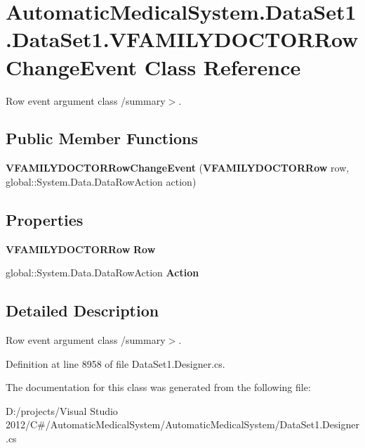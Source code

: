 \section{AutomaticMedicalSystem.DataSet1.DataSet1.VFAMILYDOCTORRowChangeEvent Class Reference}
\label{class_automatic_medical_system_1_1_data_set1_1_1_v_f_a_m_i_l_y_d_o_c_t_o_r_row_change_event}
Row event argument class /summary$>$.  


\subsection*{Public Member Functions}
\begin{CompactItemize}
\item 
\textbf{VFAMILYDOCTORRowChangeEvent} ({\bf VFAMILYDOCTORRow} row, global::System.Data.DataRowAction action)\label{class_automatic_medical_system_1_1_data_set1_1_1_v_f_a_m_i_l_y_d_o_c_t_o_r_row_change_event_9300b8d2800e99d0dbb53a417e31b343}

\end{CompactItemize}
\subsection*{Properties}
\begin{CompactItemize}
\item 
{\bf VFAMILYDOCTORRow} \textbf{Row}\hspace{0.3cm}{\tt  [get]}\label{class_automatic_medical_system_1_1_data_set1_1_1_v_f_a_m_i_l_y_d_o_c_t_o_r_row_change_event_2fbc9f25f5fee074cf82a209789df0ed}

\item 
global::System.Data.DataRowAction \textbf{Action}\hspace{0.3cm}{\tt  [get]}\label{class_automatic_medical_system_1_1_data_set1_1_1_v_f_a_m_i_l_y_d_o_c_t_o_r_row_change_event_bad7cbef50ada47a9115b5d3283845d7}

\end{CompactItemize}


\subsection{Detailed Description}
Row event argument class /summary$>$. 

Definition at line 8958 of file DataSet1.Designer.cs.

The documentation for this class was generated from the following file:\begin{CompactItemize}
\item 
D:/projects/Visual Studio 2012/C\#/AutomaticMedicalSystem/AutomaticMedicalSystem/DataSet1.Designer.cs\end{CompactItemize}
